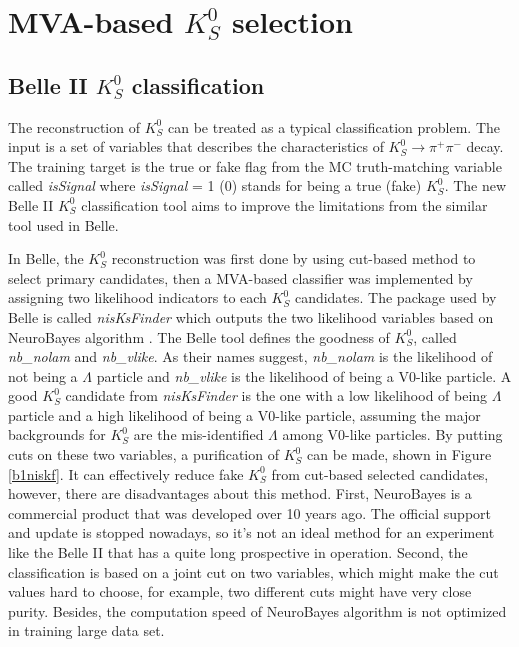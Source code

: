 \begin{comment}
\begin{figure}[htpb]
\centering
\texttt{[image: VXDGEO.png]}
\caption{Geometric structure of PXD and SVD in Belle II\cite{Abe:2010gxa}. SVD Layer 5 is at $r = 11$ cm and $K_S^0$ that decay outside are very likely to lose SVD hits information.}
\label{fig:vxdgeo}
\end{figure}
\end{comment}





\section{MVA-based $K_S^0$ selection}

\subsection{Belle II $K_S^0$ classification}
The reconstruction of $K_S^0$ can be treated as a typical classification problem. The input is a set of variables that describes the characteristics of $K_S^0 \to \pi^+ \pi^-$ decay. The training  target is the true or fake flag from the MC truth-matching variable called \textit{isSignal} where \textit{isSignal} = 1 (0) stands for being a true (fake) $K_S^0$. The new Belle II $K_S^0$ classification tool aims to improve the limitations from the similar tool used in Belle.
 
 In Belle, the $K_S^0$ reconstruction was first done by using cut-based method to select primary candidates, then a MVA-based classifier was implemented by assigning two likelihood indicators to each $K_S^0$ candidates. The package used by Belle is called \textit{nisKsFinder} \cite{b2book} which outputs the two likelihood variables based on NeuroBayes algorithm \cite{feindt2006neurobayes}. The Belle tool defines the goodness of $K_S^0$, called \textit{nb\_nolam} and \textit{nb\_vlike}. As their names suggest, \textit{nb\_nolam} is the likelihood of not being a $\Lambda$ particle and \textit{nb\_vlike} is the likelihood of being a V0-like particle. A good $K_S^0$ candidate from \textit{nisKsFinder} is the one with a low likelihood of being $\Lambda$ particle and a high likelihood of being a V0-like particle, assuming the major backgrounds for $K_S^0$ are the mis-identified $\Lambda$ among V0-like particles. By putting cuts on these two variables, a purification of $K_S^0$ can be made, shown in Figure \ref{b1niskf}. It can effectively reduce fake $K_S^0$ from cut-based selected candidates, however, there are disadvantages about this method. First, NeuroBayes is a commercial product that was developed over 10 years ago. The official support and update is stopped nowadays, so it's not an ideal method for an experiment like the Belle II that has a quite long prospective in operation. Second, the classification is based on a joint cut on two variables, which might make the cut values hard to choose, for example, two different cuts might have very close purity. Besides, the computation speed of NeuroBayes algorithm is not optimized in training large data set.

